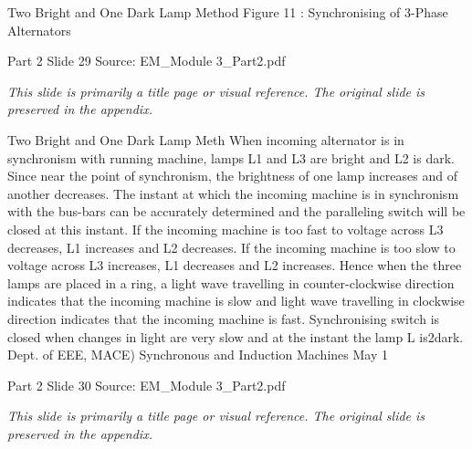 \documentclass[11pt,a4paper]{article}
\begin{document}
\begin{mdframed}[roundcorner=9pt,backgroundcolor=white,linecolor=anthOrange,linewidth=1pt,innerleftmargin=12pt,innerrightmargin=12pt,innertopmargin=10pt,innerbottommargin=10pt,skipabove=8pt,skipbelow=10pt]
{\HeadingFont\fontsize{15}{18}\selectfont\color{anthDark}Two Bright and One Dark Lamp Method Figure 11 : Synchronising of 3-Phase Alternators\par}
{\color{anthMid}\small Part 2 \textbullet{} Slide 29 \textbullet{} Source: EM\_Module 3\_Part2.pdf\par}
\vspace{0.5em}
{\small
\textit{This slide is primarily a title page or visual reference. The original slide is preserved in the appendix.}

}
\end{mdframed}

\begin{mdframed}[roundcorner=9pt,backgroundcolor=white,linecolor=anthBlue,linewidth=1pt,innerleftmargin=12pt,innerrightmargin=12pt,innertopmargin=10pt,innerbottommargin=10pt,skipabove=8pt,skipbelow=10pt]
{\HeadingFont\fontsize{15}{18}\selectfont\color{anthDark}Two Bright and One Dark Lamp Meth When incoming alternator is in synchronism with running machine, lamps L1 and L3 are bright and L2 is dark. Since near the point of synchronism, the brightness of one lamp increases and of another decreases. The instant at which the incoming machine is in synchronism with the bus-bars can be accurately determined and the paralleling switch will be closed at this instant. If the incoming machine is too fast to voltage across L3 decreases, L1 increases and L2 decreases. If the incoming machine is too slow to voltage across L3 increases, L1 decreases and L2 increases. Hence when the three lamps are placed in a ring, a light wave travelling in counter-clockwise direction indicates that the incoming machine is slow and light wave travelling in clockwise direction indicates that the incoming machine is fast. Synchronising switch is closed when changes in light are very slow and at the instant the lamp L is2dark. Dept. of EEE, MACE)   Synchronous and Induction Machines   May 1\par}
{\color{anthMid}\small Part 2 \textbullet{} Slide 30 \textbullet{} Source: EM\_Module 3\_Part2.pdf\par}
\vspace{0.5em}
{\small
\textit{This slide is primarily a title page or visual reference. The original slide is preserved in the appendix.}

}
\end{mdframed}
\end{document}

